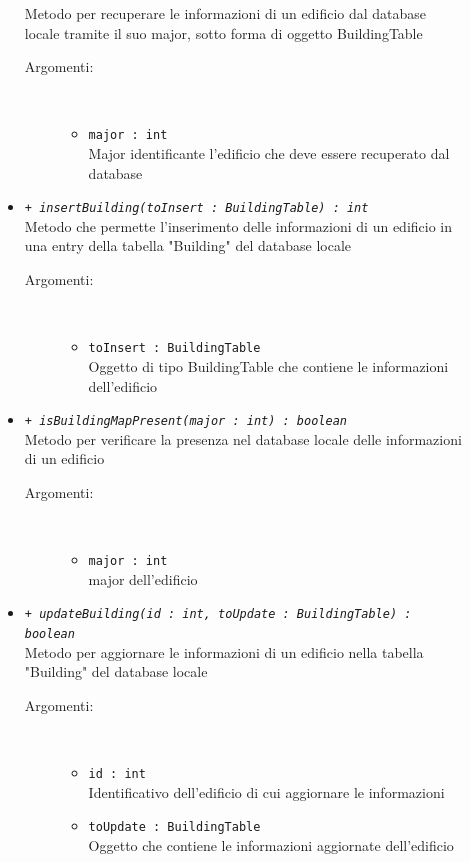 \documentclass[../DefinizioneDiProdotto.tex]{subfiles}
\begin{document}
\begin{description}
\begin{itemize}
		Metodo per recuperare le informazioni di un edificio dal database locale tramite il suo major, sotto forma di oggetto BuildingTable
		\begin{description}
			\item[Argomenti:] \
			\begin{itemize}
				\item \texttt{major : int}\\
				Major identificante l'edificio che deve essere recuperato dal database\end{itemize}
		\end{description}
		\item \texttt{+ \textit{insertBuilding(toInsert : BuildingTable) : int}}\\
		Metodo che permette l'inserimento delle informazioni di un edificio in una entry della tabella "Building" del database locale
		\begin{description}
			\item[Argomenti:] \
			\begin{itemize}
				\item \texttt{toInsert : BuildingTable}\\
				Oggetto di tipo BuildingTable che contiene le informazioni dell'edificio\end{itemize}
		\end{description}
		\item \texttt{+ \textit{isBuildingMapPresent(major : int) : boolean}}\\
		Metodo per verificare la presenza nel database locale delle informazioni di un edificio
		\begin{description}
			\item[Argomenti:] \
			\begin{itemize}
				\item \texttt{major : int}\\
				major dell'edificio\end{itemize}
		\end{description}
		\item \texttt{+ \textit{updateBuilding(id : int, toUpdate : BuildingTable) : boolean}}\\
		Metodo per aggiornare le informazioni di un edificio nella tabella "Building" del database locale
		\begin{description}
			\item[Argomenti:] \
			\begin{itemize}
				\item \texttt{id : int}\\
				Identificativo dell'edificio di cui aggiornare le informazioni\item \texttt{toUpdate : BuildingTable}\\
				Oggetto che contiene le informazioni aggiornate dell'edificio\end{itemize}
		\end{description}
	\end{itemize}
\end{description}
\end{document}
